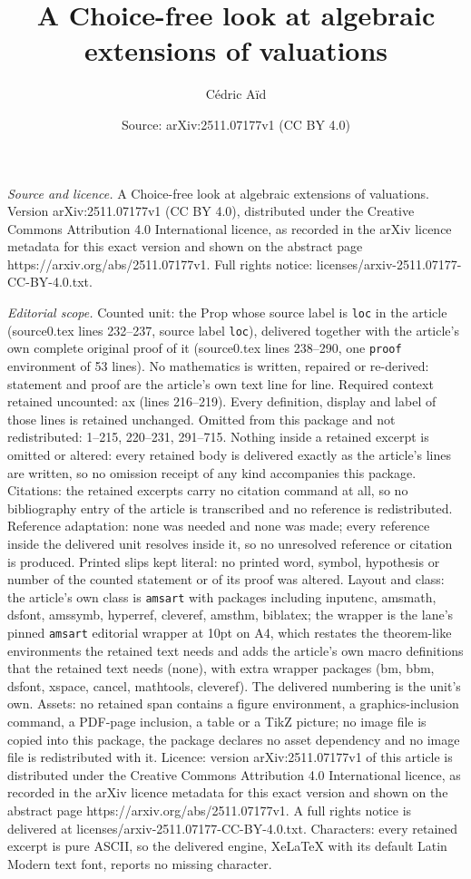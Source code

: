 \documentclass[10pt,a4paper]{amsart}
\title[A Choice-free look at algebraic extensions of valuations]{A Choice-free look at algebraic extensions of valuations}
\author{C\'edric A\"id}
\date{Source: arXiv:2511.07177v1 (CC BY 4.0)}
\begin{document}
\maketitle

\noindent\emph{Source and licence.} A Choice-free look at algebraic extensions of valuations. Version arXiv:2511.07177v1 (CC BY 4.0), distributed under the Creative Commons Attribution 4.0 International licence, as recorded in the arXiv licence metadata for this exact version and shown on the abstract page https://arxiv.org/abs/2511.07177v1. Full rights notice: licenses/arxiv-2511.07177-CC-BY-4.0.txt.\par\smallskip

\noindent\textit{Editorial scope.} Counted unit: the Prop whose source label is \texttt{loc} in the article (source0.tex lines 232--237, source label \texttt{loc}), delivered together with the article's own complete original proof of it (source0.tex lines 238--290, one \texttt{proof} environment of 53 lines). No mathematics is written, repaired or re-derived: statement and proof are the article's own text line for line. Required context retained uncounted: ax (lines 216--219). Every definition, display and label of those lines is retained unchanged. Omitted from this package and not redistributed: 1--215, 220--231, 291--715. Nothing inside a retained excerpt is omitted or altered: every retained body is delivered exactly as the article's lines are written, so no omission receipt of any kind accompanies this package. Citations: the retained excerpts carry no citation command at all, so no bibliography entry of the article is transcribed and no reference is redistributed. Reference adaptation: none was needed and none was made; every reference inside the delivered unit resolves inside it, so no unresolved reference or citation is produced. Printed slips kept literal: no printed word, symbol, hypothesis or number of the counted statement or of its proof was altered. Layout and class: the article's own class is \texttt{amsart} with packages including inputenc, amsmath, dsfont, amssymb, hyperref, cleveref, amsthm, biblatex; the wrapper is the lane's pinned \texttt{amsart} editorial wrapper at 10pt on A4, which restates the theorem-like environments the retained text needs and adds the article's own macro definitions that the retained text needs (none), with extra wrapper packages (bm, bbm, dsfont, xspace, cancel, mathtools, cleveref). The delivered numbering is the unit's own. Assets: no retained span contains a figure environment, a graphics-inclusion command, a PDF-page inclusion, a table or a TikZ picture; no image file is copied into this package, the package declares no asset dependency and no image file is redistributed with it. Licence: version arXiv:2511.07177v1 of this article is distributed under the Creative Commons Attribution 4.0 International licence, as recorded in the arXiv licence metadata for this exact version and shown on the abstract page https://arxiv.org/abs/2511.07177v1. A full rights notice is delivered at licenses/arxiv-2511.07177-CC-BY-4.0.txt. Characters: every retained excerpt is pure ASCII, so the delivered engine, XeLaTeX with its default Latin Modern text font, reports no missing character.
\end{document}

